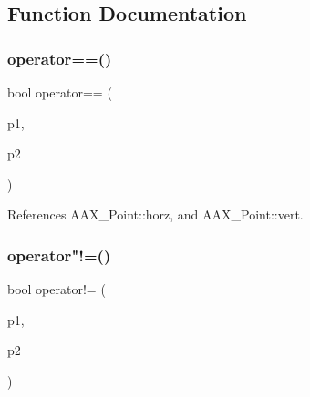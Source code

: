 \subsection{Function Documentation}
\mbox{\label{a00503_a899f910710cb6ccc0a7558221b6662a2}} 
\subsubsection{\texorpdfstring{operator==()}{operator==()}\hspace{0.1cm}{\footnotesize\ttfamily [1/2]}}
{\footnotesize\ttfamily bool operator== (\begin{DoxyParamCaption}\item[{const \mbox{\hyperlink{a01609}{A\+A\+X\+\_\+\+Point}} \&}]{p1,  }\item[{const \mbox{\hyperlink{a01609}{A\+A\+X\+\_\+\+Point}} \&}]{p2 }\end{DoxyParamCaption})\hspace{0.3cm}{\ttfamily [inline]}}



References A\+A\+X\+\_\+\+Point\+::horz, and A\+A\+X\+\_\+\+Point\+::vert.

\mbox{\label{a00503_a0eb2e452ed0865872e0f0862dee6ca29}} 
\subsubsection{\texorpdfstring{operator"!=()}{operator!=()}\hspace{0.1cm}{\footnotesize\ttfamily [1/2]}}
{\footnotesize\ttfamily bool operator!= (\begin{DoxyParamCaption}\item[{const \mbox{\hyperlink{a01609}{A\+A\+X\+\_\+\+Point}} \&}]{p1,  }\item[{const \mbox{\hyperlink{a01609}{A\+A\+X\+\_\+\+Point}} \&}]{p2 }\end{DoxyParamCaption})\hspace{0.3cm}{\ttfamily [inline]}}

\mbox{\label{a00503_acf1fd6c19f55dafdee37e5ba34b24833}} 
